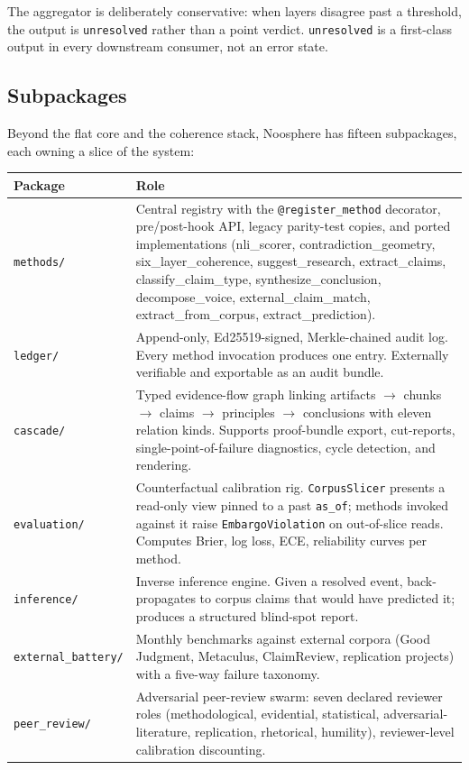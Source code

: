 \documentclass[11pt,letterpaper]{article}
\newcommand{\file}[1]{\texttt{#1}}
\begin{document}
The aggregator is deliberately conservative: when layers disagree past a threshold, the output is \texttt{unresolved} rather than a point verdict. \texttt{unresolved} is a first-class output in every downstream consumer, not an error state.

\subsection{Subpackages}

Beyond the flat core and the coherence stack, Noosphere has fifteen subpackages, each owning a slice of the system:

\begin{longtable}{p{2.4cm} p{12.1cm}}
\toprule
\textbf{Package} & \textbf{Role} \\
\midrule
\endhead
\file{methods/}       & Central registry with the \texttt{@register\_method} decorator, pre/post-hook API, legacy parity-test copies, and ported implementations (nli\_scorer, contradiction\_geometry, six\_layer\_coherence, suggest\_research, extract\_claims, classify\_claim\_type, synthesize\_conclusion, decompose\_voice, external\_claim\_match, extract\_from\_corpus, extract\_prediction). \\
\file{ledger/}        & Append-only, Ed25519-signed, Merkle-chained audit log. Every method invocation produces one entry. Externally verifiable and exportable as an audit bundle. \\
\file{cascade/}       & Typed evidence-flow graph linking artifacts $\to$ chunks $\to$ claims $\to$ principles $\to$ conclusions with eleven relation kinds. Supports proof-bundle export, cut-reports, single-point-of-failure diagnostics, cycle detection, and rendering. \\
\file{evaluation/}    & Counterfactual calibration rig. \texttt{CorpusSlicer} presents a read-only view pinned to a past \texttt{as\_of}; methods invoked against it raise \texttt{EmbargoViolation} on out-of-slice reads. Computes Brier, log loss, ECE, reliability curves per method. \\
\file{inference/}     & Inverse inference engine. Given a resolved event, back-propagates to corpus claims that would have predicted it; produces a structured blind-spot report. \\
\file{external\_battery/} & Monthly benchmarks against external corpora (Good Judgment, Metaculus, ClaimReview, replication projects) with a five-way failure taxonomy. \\
\file{peer\_review/}  & Adversarial peer-review swarm: seven declared reviewer roles (methodological, evidential, statistical, adversarial-literature, replication, rhetorical, humility), reviewer-level calibration discounting. \\

\end{longtable}
\end{document}
